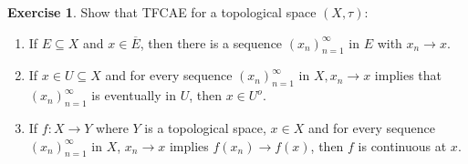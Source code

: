 \documentclass[12pt]{extarticle}
\newcommand{\<}{\langle}
\renewcommand{\>}{\rangle}
\theoremstyle{definition}
\newtheorem{exercise}{Exercise}
\begin{document}
\begin{exercise}
  Show that TFCAE for a topological space $(X, \tau)$:
  \begin{enumerate}
  \item
    If $E \subseteq X$ and $x \in \overline{E}$, then there is a sequence $(x_n)_{n=1}^{\infty}$ in $E$ with $x_n \to x$.
  \item
    If $x \in U \subseteq X$ and for every sequence $(x_n)_{n=1}^{\infty}$ in $X, x_n \to x$ implies that $(x_n)_{n=1}^{\infty}$ is eventually in $U$, then $x \in U^o$.
  \item
    If $f:X \to Y$ where $Y$ is a topological space, $x \in X$ and for every sequence $(x_n)_{n=1}^{\infty}$ in $X$, $x_n \to x$ implies $f(x_n) \to f(x)$,
    then $f$ is continuous at $x$. 
  \end{enumerate}
\end{exercise}
\end{document}
